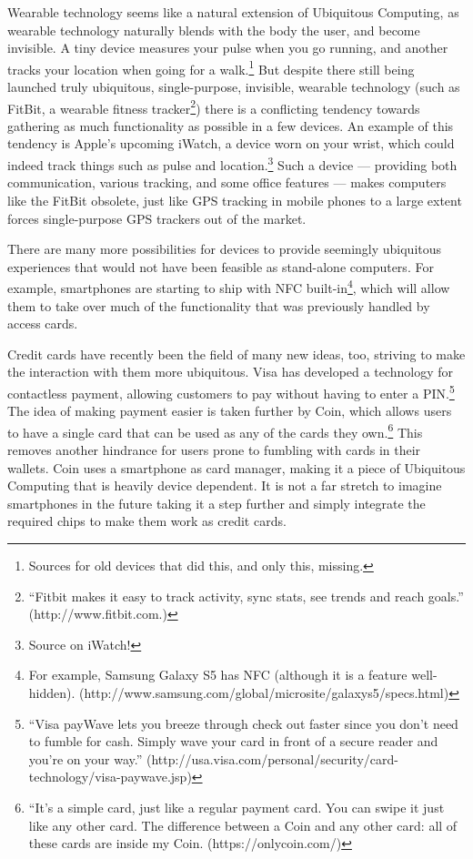 Wearable technology seems like a natural extension of Ubiquitous Computing, as wearable technology naturally blends with the body
the user, and become invisible. A tiny device measures your pulse when you go running, and another tracks your location when going for a
walk.\footnote{Sources for old devices that did this, and only this, missing.} But despite there still being launched truly ubiquitous,
single-purpose, invisible, wearable technology (such as FitBit, a wearable fitness tracker\footnote{``Fitbit makes it easy to track
activity, sync stats, see trends and reach goals.'' (http://www.fitbit.com.)}) there is a conflicting tendency towards gathering as much
functionality as possible in a few devices. An example of this tendency is Apple's upcoming iWatch, a device worn on your wrist, which
could indeed track things such as pulse and location.\footnote{Source on iWatch!} Such a device --- providing both communication,
various tracking, and some office features --- makes computers like the FitBit obsolete, just like GPS tracking in mobile phones to a
large extent forces single-purpose GPS trackers out of the market.

There are many more possibilities for devices to provide seemingly ubiquitous experiences that would not have been feasible as stand-alone
computers. For example, smartphones are starting to ship with NFC built-in\footnote{For example, Samsung Galaxy S5 has NFC (although it is
a feature well-hidden). (http://www.samsung.com/global/microsite/galaxys5/specs.html)}, which will allow them to take over much of the
functionality that was previously handled by access cards.

Credit cards have recently been the field of many new ideas, too, striving to make the interaction with them more ubiquitous. Visa has developed
a technology for contactless payment, allowing customers to pay without having to enter a PIN.\footnote{``Visa payWave lets you breeze through
check out faster since you don't need to fumble for cash. Simply wave your card in front of a secure reader and you’re on your way.''
(http://usa.visa.com/personal/security/card-technology/visa-paywave.jsp)} The idea of making payment easier is taken further by Coin, which
allows users to have a single card that can be used as any of the cards they own.\footnote{``It's a simple card, just like a regular payment
card. You can swipe it just like any other card. The difference between a Coin and any other card: all of these cards are inside my Coin.
(https://onlycoin.com/)} This removes another hindrance for users prone to fumbling with cards in their wallets. Coin uses a smartphone as card
manager, making it a piece of Ubiquitous Computing that is heavily device dependent. It is not a far stretch to imagine smartphones in the
future taking it a step further and simply integrate the required chips to make them work as credit cards.

